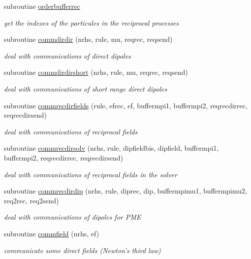 \begin{DoxyCompactItemize}
subroutine \hyperlink{mpistuff_8f90_a0bf418e3df3f76e4c5a4e8f9d423353a}{orderbufferrec}
\begin{DoxyCompactList}\small\item\em get the indexes of the particules in the reciprocal processes \end{DoxyCompactList}\item 
subroutine \hyperlink{mpistuff_8f90_acc69651cda59fbbb9f85f4ed992103c2}{commdirdir} (nrhs, rule, mu, reqrec, reqsend)
\begin{DoxyCompactList}\small\item\em deal with communications of direct dipoles \end{DoxyCompactList}\item 
subroutine \hyperlink{mpistuff_8f90_a9c9d1b0468cbe5ca9cb9882c172a93a6}{commdirdirshort} (nrhs, rule, mu, reqrec, reqsend)
\begin{DoxyCompactList}\small\item\em deal with communications of short range direct dipoles \end{DoxyCompactList}\item 
subroutine \hyperlink{mpistuff_8f90_a40c8a6ddd87fab6ae74279d480e529f7}{commrecdirfields} (rule, efrec, ef, buffermpi1, buffermpi2, reqrecdirrec, reqrecdirsend)
\begin{DoxyCompactList}\small\item\em deal with communications of reciprocal fields \end{DoxyCompactList}\item 
subroutine \hyperlink{mpistuff_8f90_ab2b79ef662d77d082d501656695d4d1f}{commrecdirsolv} (nrhs, rule, dipfieldbis, dipfield, buffermpi1, buffermpi2, reqrecdirrec, reqrecdirsend)
\begin{DoxyCompactList}\small\item\em deal with communications of reciprocal fields in the solver \end{DoxyCompactList}\item 
subroutine \hyperlink{mpistuff_8f90_a6891ab58868da4b7a79b2b654c4d2d62}{commrecdirdip} (nrhs, rule, diprec, dip, buffermpimu1, buffermpimu2, req2rec, req2send)
\begin{DoxyCompactList}\small\item\em deal with communications of dipoles for P\-M\-E \end{DoxyCompactList}\item 
subroutine \hyperlink{mpistuff_8f90_a50dba030f2bb47194b1210696b79e209}{commfield} (nrhs, ef)
\begin{DoxyCompactList}\small\item\em communicate some direct fields (Newton's third law) \end{DoxyCompactList}\item 

\end{DoxyCompactItemize}
